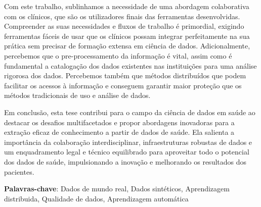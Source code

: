Com este trabalho, sublinhamos a necessidade de uma abordagem colaborativa com os clínicos, que são os utilizadores finais das ferramentas desenvolvidas. Compreender as suas necessidades e fluxos de trabalho é primordial, exigindo ferramentas fáceis de usar que os clínicos possam integrar perfeitamente na sua prática sem precisar de formação extensa em ciência de dados. Adicionalmente, percebemos que o pre-processamento da informação é vital, assim como é fundamental a catalogação dos dados existentes nas instituições para uma análise rigorosa dos dados. Percebemos também que métodos distribuídos que podem facilitar os acessos à informação e conseguem garantir maior proteção que os métodos tradicionais de uso e análise de dados.

Em conclusão, esta tese contribui para o campo da ciência de dados em saúde ao destacar os desafios multifacetados e propor abordagens inovadoras para a extração eficaz de conhecimento a partir de dados de saúde. Ela salienta a importância da colaboração interdisciplinar, infraestruturas robustas de dados e um enquadramento legal e técnico equilibrado para aproveitar todo o potencial dos dados de saúde, impulsionando a inovação e melhorando os resultados dos pacientes.

\vspace*{10mm}\noindent
\textbf{Palavras-chave}: Dados de mundo real, Dados sintéticos, Aprendizagem distribuida, Qualidade de dados, Aprendizagem automática
